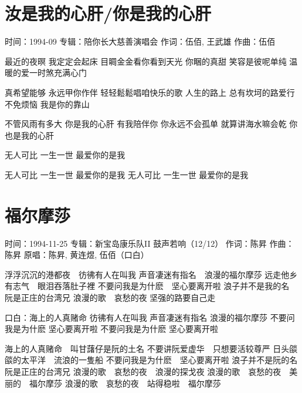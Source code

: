 \documentclass[UTF8,a4paper,oneside,twocolumn,12pt]{ctexbook}
\newcommand{\infopair}[2]{\textbullet #1：#2}
\newcommand{\zc}[1][伍佰]{\infopair{作词}{#1}}
\newcommand{\zq}[1][伍佰]{\infopair{作曲}{#1}}
\newcommand{\zj}[1]{\infopair{专辑}{#1}}
\newcommand{\yc}[1]{\infopair{原唱}{#1}}
\newcommand{\sj}[1]{\infopair{时间}{#1}}
\newenvironment{info}{\begin{flushleft}\kaishu
	}
	{\end{flushleft}\normalsize\yahei\par}
\newenvironment{lyric}{
	}
{}
\begin{document}
\section{汝是我的心肝/你是我的心肝}
\begin{info}
	\sj{1994-09}
	\zj{陪你长大慈善演唱会}
	\zc[伍佰, 王武雄]
	\zq
\end{info}
\begin{lyric}
	最近的夜暝 我定定会起床 目睭金金看你看到天光
	你睏的真甜 笑容是彼呢单纯 温暖的爱一时煞充满心门

	真希望能够 永远甲你作伴 轻轻鬆鬆唱咱快乐的歌
	人生的路上 总有坎坷的路爱行 不免烦恼 我是你的靠山

	不管风雨有多大 你是我的心肝 有我陪伴你 你永远不会孤单
	就算讲海水嘛会乾 你也是我的心肝

	无人可比 一生一世 最爱你的是我

	无人可比 一生一世 最爱你的是我
	无人可比 一生一世 最爱你的是我
\end{lyric}

\section{福尔摩莎}
\begin{info}%
	\sj{1994-11-25}
	\zj{新宝岛康乐队II 鼓声若响（12/12）}
	\zc[陈昇]
	\zq[陈昇]
	\yc{陈昇, 黄连煜, 伍佰（口白）}
\end{info}
\begin{lyric}%
	浮浮沉沉的港都夜　彷彿有人在叫我
	声音凄迷有指名　浪漫的福尔摩莎
	远走他乡有志气　眼泪吞落肚子裡
	不要问我是为什麽　坚心要离开啦
	浪子并不是我的名　阮是正庄的台湾兄
	浪漫的歌　哀愁的夜
	坚强的路要自己走

	口白：海上的人真赌命
	彷彿有人在叫我
	声音凄迷有指名
	浪漫的福尔摩莎
	不要问我是为什麽
	坚心要离开啦
	不要问我是为什麽
	坚心要离开啦﻿

	海上的人真赌命　叫甘藷仔是阮的土名
	不要讲阮爱虚华　只想要活较尊严
	日头燄燄的太平洋　流浪的一隻船
	不要问我是为什麽　坚心要离开啦
	浪子并不是阮的名　阮是正庄的台湾兄
	浪漫的歌　哀愁的夜　浪漫的探戈夜
	浪漫的歌　哀愁的夜　美丽的　福尔摩莎
	浪漫的歌　哀愁的夜　站得稳啦　福尔摩莎
\end{lyric}
\end{document}
